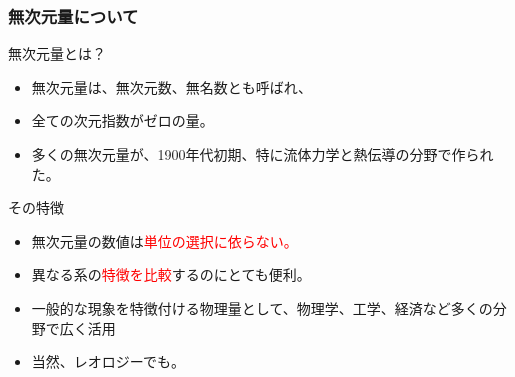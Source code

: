 \documentclass[unicode,12pt,aspectratio=169]{beamer}
\begin{document}
\begin{frame}
	\frametitle{無次元量について}
		\begin{block}{無次元量とは？}
			\begin{itemize}
				\item 無次元量は、無次元数、無名数とも呼ばれ、
				\item 全ての次元指数がゼロの量。
				\item 多くの無次元量が、1900年代初期、特に流体力学と熱伝導の分野で作られた。
			\end{itemize}
		\end{block}
		\begin{block}{その特徴}
			\begin{itemize}
				\item 無次元量の数値は\textcolor{red}{単位の選択に依らない。}
				\item 異なる系の\textcolor{red}{特徴を比較}するのにとても便利。
				\item 一般的な現象を特徴付ける物理量として、物理学、工学、経済など多くの分野で広く活用
				\item 当然、レオロジーでも。
			\end{itemize}
		\end{block}
\end{frame}
\end{document}
